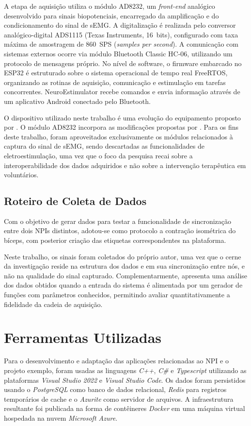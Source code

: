 A etapa de aquisição utiliza o módulo AD8232, um \textit{front-end} analógico desenvolvido para sinais biopotenciais, encarregado da amplificação e do condicionamento do sinal de sEMG. A digitalização é realizada pelo conversor analógico-digital ADS1115 (Texas Instruments, 16~bits), configurado com taxa máxima de amostragem de 860~SPS (\textit{samples per second}). A comunicação com sistemas externos ocorre via módulo Bluetooth Classic HC-06, utilizando um protocolo de mensagens próprio. No nível de software, o firmware embarcado no ESP32 é estruturado sobre o sistema operacional de tempo real FreeRTOS, organizando as rotinas de aquisição, comunicação e estimulação em tarefas concorrentes. NeuroEstimulator recebe comandos e envia informação através de um aplicativo Android conectado pelo Bluetooth.

O dispositivo utilizado neste trabalho é uma evolução do equipamento proposto por . O módulo AD8232 incorpora as modificações propostas por . Para os fins deste trabalho, foram aproveitados exclusivamente os módulos relacionados à captura do sinal de sEMG, sendo descartadas as funcionalidades de eletroestimulação, uma vez que o foco da pesquisa recai sobre a interoperabilidade dos dados adquiridos e não sobre a intervenção terapêutica em voluntários.

\subsection{Roteiro de Coleta de Dados}

Com o objetivo de gerar dados para testar a funcionalidade de sincronização entre dois NPIs distintos, adotou-se como protocolo a contração isométrica do bíceps, com posterior criação das etiquetas correspondentes na plataforma. %

Neste trabalho, os sinais foram coletados do próprio autor, uma vez que o cerne da investigação reside na estrutura dos dados e em sua sincronização entre nós, e não na qualidade do sinal capturado. Complementarmente, apresenta uma análise dos dados obtidos quando a entrada do sistema é alimentada por um gerador de funções com parâmetros conhecidos, permitindo avaliar quantitativamente a fidelidade da cadeia de aquisição.

\section{Ferramentas Utilizadas}\label{sec:ferramentas}

Para o desenvolvimento e adaptação das aplicações relacionadas ao NPI e o projeto exemplo, foram usadas as linguagens \textit{C++}, \textit{C\#} e \textit{Typescript} utilizando as plataformas \textit{Visual Studio 2022} e \textit{Visual Studio Code}. Os dados foram persistidos usando o \textit{PostgreSQL} como banco de dados relacional, \textit{Redis} para registros temporários de cache e o \textit{Azurite} como servidor de arquivos. A infraestrutura resultante foi publicada na forma de contêineres \textit{Docker} em uma máquina virtual hospedada na nuvem \textit{Microsoft Azure}.